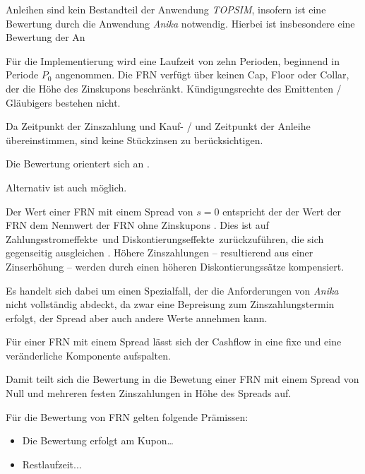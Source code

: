 \documentclass[12pt, a4paper]{article}
\theoremstyle{plain}
\begin{document}
Anleihen sind kein Bestandteil der Anwendung \textit{TOPSIM}, insofern ist eine Bewertung durch die Anwendung \textit{Anika} notwendig.
Hierbei ist insbesondere eine Bewertung der An %

Für die Implementierung wird eine Laufzeit von zehn Perioden, beginnend in Periode $P_0$ angenommen.
Die \gls{FRN} verfügt über keinen Cap, Floor oder Collar, der die Höhe des Zinskupons beschränkt.
Kündigungsrechte des Emittenten / Gläubigers bestehen nicht.

Da Zeitpunkt der Zinszahlung und Kauf- / und Zeitpunkt der Anleihe übereinstimmen, sind keine Stückzinsen zu berücksichtigen.

Die Bewertung orientert sich an \autocite[][]{veronesi_fixed_2010}.


Alternativ ist auch \autocite[][]{fabozzi_handbook_2005} möglich.

Der Wert einer \gls{FRN} mit einem Spread von $s=0$ entspricht der der Wert der \gls{FRN} dem Nennwert der \gls{FRN} ohne Zinskupons \autocite[][S.~52~f.]{veronesi_fixed_2010}. Dies ist auf \glqq Zahlungsstromeffekte\grqq~und \glqq Diskontierungseffekte\grqq~zurückzuführen, die sich gegenseitig ausgleichen \autocite[][S.~54]{veronesi_fixed_2010}. Höhere Zinszahlungen -- resultierend aus einer Zinserhöhung -- werden durch einen höheren Diskontierungssätze kompensiert.

Es handelt sich dabei um einen Spezialfall, der die Anforderungen von \textit{Anika} nicht vollständig abdeckt, da zwar eine Bepreisung zum Zinszahlungstermin erfolgt, der Spread aber auch andere Werte annehmen kann.

Für einer \gls{FRN} mit einem Spread lässt sich der Cashflow in eine fixe und eine veränderliche Komponente aufspalten.

Damit teilt sich die Bewertung in die Bewetung einer \gls{FRN} mit einem Spread von Null und mehreren festen Zinszahlungen in Höhe des Spreads auf.

Für die Bewertung von \gls{FRN} gelten folgende Prämissen:
\begin{itemize}
	\item Die Bewertung erfolgt am Kupon\dots
	\item Restlaufzeit...
\end{itemize}

\end{document}
